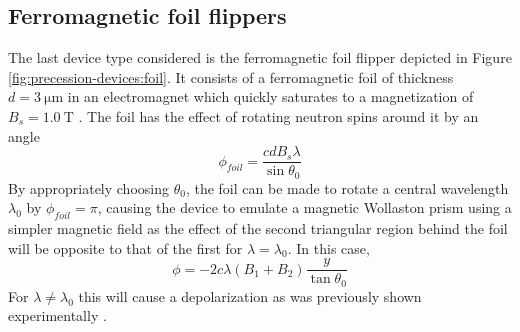 \subsection{Ferromagnetic foil flippers}
The last device type considered is the ferromagnetic foil flipper depicted in Figure \ref{fig:precession-devices:foil}. It consists of a ferromagnetic foil of thickness $d = \SI{3}{\micro\meter}$ in an electromagnet which quickly saturates to a magnetization of $B_s = \SI{1.0}{\tesla}$ \cite{kraan2003}. The foil has the effect of rotating neutron spins around it by an angle 
$$\phi_{foil} = \frac{cdB_s\lambda}{\sin\theta_0}$$
By appropriately choosing $\theta_0$, the foil can be made to rotate a central wavelength $\lambda_0$ by $\phi_{foil} = \pi$, causing the device to emulate a magnetic Wollaston prism using a simpler magnetic field as the effect of the second triangular region behind the foil will be opposite to that of the first for $\lambda = \lambda_0$. In this case,
$$\phi = -2c\lambda (B_1 + B_2) \frac{y}{\tan\theta_0}$$
For $\lambda \neq \lambda_0$ this will cause a depolarization as was previously shown experimentally \cite{kraan2003}.
